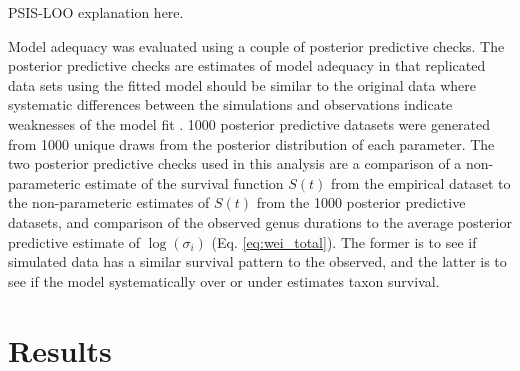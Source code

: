 \documentclass{article}
\begin{document}
PSIS-LOO explanation here.


Model adequacy was evaluated using a couple of posterior predictive checks. The posterior predictive checks are estimates of model adequacy in that replicated data sets using the fitted model should be similar to the original data where systematic differences between the simulations and observations indicate weaknesses of the model fit \citep{Gelman2013d}. 1000 posterior predictive datasets were generated from 1000 unique draws from the posterior distribution of each parameter. The two posterior predictive checks used in this analysis are a comparison of a non-parameteric estimate of the survival function \(S(t)\) from the empirical dataset to the non-parameteric estimates of \(S(t)\) from the 1000 posterior predictive datasets, and comparison of the observed genus durations to the average posterior predictive estimate of \(\log(\sigma_{i})\) (Eq. \ref{eq:wei_total}). The former is to see if simulated data has a similar survival pattern to the observed, and the latter is to see if the model systematically over or under estimates taxon survival.





\section{Results}


%
\end{document}
